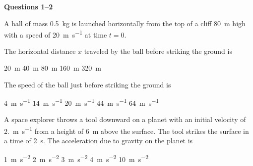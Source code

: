 \documentclass{../../../oss-classkick-exam}
\begin{document}
\genheader


\genmultidirections

\gengravity

\raggedcolumns
\begin{multicols*}{2}

  \textbf{Questions 1--2}
  
  A ball of mass \SI{.5}{\kilo\gram} is launched
  horizontally from the top of a cliff \SI{80}{\metre} high with a speed of
  \SI{20}{\metre\per\second} at time $t=0$.
  
  \begin{center}
  \end{center}
  \begin{questions}
    \question The horizontal distance $x$ traveled by the ball before striking
    the ground is
    \begin{choices}
      \choice\SI{20}{\metre}
      \choice\SI{40}{\metre}
      \choice\SI{80}{\metre} 
      \choice\SI{160}{\metre}
      \choice\SI{320}{\metre}
    \end{choices}
    
    \question The speed of the ball just before striking the ground is
    \begin{choices}
      \choice\SI{4}{\metre\per\second}
      \choice\SI{14}{\metre\per\second}
      \choice\SI{20}{\metre\per\second}
      \choice\SI{44}{\metre\per\second}
      \choice\SI{64}{\metre\per\second}
    \end{choices}

    \question A space explorer throws a tool downward on a planet with an
    initial velocity of \SI{2.}{\metre\per\second} from a height of
    \SI{6}{\metre} above the surface. The tool strikes the surface in a time of
    \SI{2}{\second}. The acceleration due to gravity on the planet is
    \begin{choices}
      \choice\SI{1}{\metre\per\second\squared}
      \choice\SI{2}{\metre\per\second\squared}
      \choice\SI{3}{\metre\per\second\squared}
      \choice\SI{4}{\metre\per\second\squared}
      \choice\SI{10}{\metre\per\second\squared}
    \end{choices}
  

\end{questions}
\end{multicols*}
\end{document}
